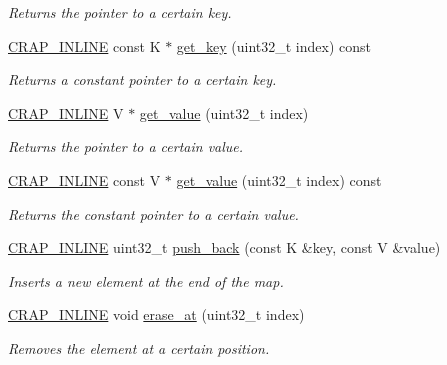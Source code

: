 \begin{DoxyCompactItemize}
\begin{DoxyCompactList}\small\item\em Returns the pointer to a certain key. \end{DoxyCompactList}\item 
\hyperlink{config__x86_8h_a5a40526b8d842e7ff731509998bb0f1c}{C\+R\+A\+P\+\_\+\+I\+N\+L\+I\+N\+E} const K $\ast$ \hyperlink{classcrap_1_1array__map_a456433fe04a8aa29b70d2f7d27598f03}{get\+\_\+key} (uint32\+\_\+t index) const 
\begin{DoxyCompactList}\small\item\em Returns a constant pointer to a certain key. \end{DoxyCompactList}\item 
\hyperlink{config__x86_8h_a5a40526b8d842e7ff731509998bb0f1c}{C\+R\+A\+P\+\_\+\+I\+N\+L\+I\+N\+E} V $\ast$ \hyperlink{classcrap_1_1array__map_a4487a042bda4b2d7436d8e9c526cd8a3}{get\+\_\+value} (uint32\+\_\+t index)
\begin{DoxyCompactList}\small\item\em Returns the pointer to a certain value. \end{DoxyCompactList}\item 
\hyperlink{config__x86_8h_a5a40526b8d842e7ff731509998bb0f1c}{C\+R\+A\+P\+\_\+\+I\+N\+L\+I\+N\+E} const V $\ast$ \hyperlink{classcrap_1_1array__map_a0f1e73f4448e6a67de07d4fb399cb327}{get\+\_\+value} (uint32\+\_\+t index) const 
\begin{DoxyCompactList}\small\item\em Returns the constant pointer to a certain value. \end{DoxyCompactList}\item 
\hyperlink{config__x86_8h_a5a40526b8d842e7ff731509998bb0f1c}{C\+R\+A\+P\+\_\+\+I\+N\+L\+I\+N\+E} uint32\+\_\+t \hyperlink{classcrap_1_1array__map_affa53595eda01cd1a229accc734b95bb}{push\+\_\+back} (const K \&key, const V \&value)
\begin{DoxyCompactList}\small\item\em Inserts a new element at the end of the map. \end{DoxyCompactList}\item 
\hyperlink{config__x86_8h_a5a40526b8d842e7ff731509998bb0f1c}{C\+R\+A\+P\+\_\+\+I\+N\+L\+I\+N\+E} void \hyperlink{classcrap_1_1array__map_ac06042b8bb4e00fdb405b757e3e50529}{erase\+\_\+at} (uint32\+\_\+t index)
\begin{DoxyCompactList}\small\item\em Removes the element at a certain position. \end{DoxyCompactList}\item 

\end{DoxyCompactItemize}
